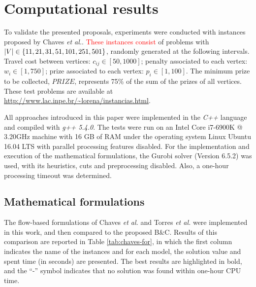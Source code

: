 \documentclass{ro}
\begin{document}
\section{Computational results}
\label{sec:results}	

To validate the presented proposals, experiments were conducted with instances proposed by Chaves \textit{et al.}\cite{chaves2005hybrid}. \textcolor{red}{These instances  consist} of problems with $ |V| \in \{11,21,31,51,\- 101, 251, 501\}$, randomly generated at the following intervals. Travel cost between vertices:  $c_{ij} \in [50,1000]$; penalty associated to each vertex:  $w_i \in [1,750]$; prize associated to each vertex: $p_i \in [1,100]$. The minimum prize to be collected,  $PRIZE$, represents 75\% of the sum of the prizes of all vertices. These test problems are available at \url{http://www.lac.inpe.br/~lorena/instancias.html}.

All approaches introduced in this paper were implemented in the \textit{C++} language and compiled with \textit{g++ 5.4.0}. The tests were run on an Intel Core i7-6900K @ 3.20GHz machine with 16 GB of RAM under the operating system Linux Ubuntu 16.04
LTS with parallel processing features disabled. For the implementation and execution of the mathematical formulations, the Gurobi solver (Version 6.5.2) was used, with its heuristics, cuts and preprocessing disabled. Also, a one-hour processing timeout was determined.





\subsection{Mathematical formulations}

%

The flow-based formulations of Chaves \textit{et al.} \cite{chaves2005hybrid} and Torres \textit{et al.} \cite{torres2003problemas} were implemented in this work, and then compared to the proposed B\&C. Results of this comparison are reported in Table \ref{tab:chaves-for}, in which the first column indicates the name of the instances and for each model, the solution value and spent time (in seconds) are presented. The best results are highlighted in bold, and the ``-'' symbol indicates that no solution was found within one-hour CPU time.
\end{document}
